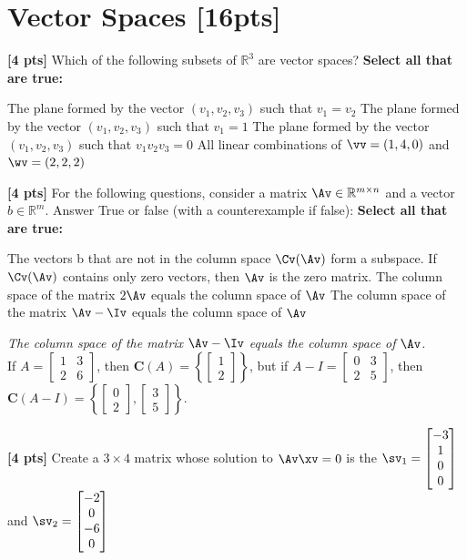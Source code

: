 \documentclass[11pt,addpoints,answers]{exam}
\numberwithin{equation}{section} %
\numberwithin{figure}{section} %
\numberwithin{table}{section} %
\newcommand{\colsp}[1]{\textbf{C$(#1)$}}
\newcommand{\twomat}[4]{\begin{bmatrix} #1 & #2 \\ #3 & #4 \end{bmatrix}}
\newcommand{\twovec}[2]{\begin{bmatrix} #1 \\ #2 \end{bmatrix}}
\begin{document}
\section{Vector Spaces  [16pts]}
\begin{questions}

\question \textbf{[4 pts]} Which of the following subsets of $\mathbb{R}^3$ are vector spaces?
    \textbf{Select all that are true:} 
    \checkboxchar{$\Box$} \checkedchar{$\blacksquare$}
    \begin{checkboxes}
        \CorrectChoice The plane formed by the vector $(v_1, v_2, v_3) $ such that $v_1 = v_2$
        \choice The plane formed by the vector $(v_1, v_2, v_3) $ such that $v_1 = 1$
        \choice The plane formed by the vector $(v_1, v_2, v_3) $  such that $v_1 v_2 v_3 = 0$
        \CorrectChoice All linear combinations of $\vv = (1, 4, 0)$ and $\wv = (2, 2, 2)$
    \end{checkboxes}

\question \textbf{[4 pts]} For the following questions, consider a matrix $\Av \in \mathbb{R}^{m \times n}$ and a vector $b \in \mathbb{R}^m$. Answer True or false (with a counterexample if false):
    \textbf{Select all that are true:} 
    \begin{checkboxes}
        \CorrectChoice The vectors b that are not in the column space $\Cv(\Av)$ form a subspace.
        \CorrectChoice If $\Cv(\Av)$ contains only zero vectors, then $\Av$ is the zero matrix.
        \CorrectChoice The column space of the matrix $2\Av$ equals the column space of $\Av$
        \choice The column space of the matrix $\Av - \Iv$ equals the column space of $\Av$
    \end{checkboxes}
    \begin{tcolorbox}[fit,height=3cm, width=\textwidth, blank, borderline={0.5pt}{-2pt}, valign=center, nobeforeafter]
        \textit{The column space of the matrix $\Av - \Iv$ equals the column space of $\Av$.}\\

        If $A = \twomat{1}{3}{2}{6}$, then $\colsp{A} = \left\{\twovec{1}{2}\right\}$, but if $A - I = \twomat{0}{3}{2}{5}$, then $\colsp{A - I} = \left\{\twovec{0}{2}, \twovec{3}{5}\right\}$.
    \end{tcolorbox}

\question \textbf{[4 pts]} Create a $3 \times 4$ matrix whose solution to $\Av \xv = 0$ is the $\sv_1=\begin{bmatrix}
         -3 \\
         1 \\
         0 \\
         0
        \end{bmatrix}$ and $\sv_2=\begin{bmatrix}
         -2 \\
         0 \\
         -6 \\
         0
        \end{bmatrix}$


\end{questions}
\end{document}
